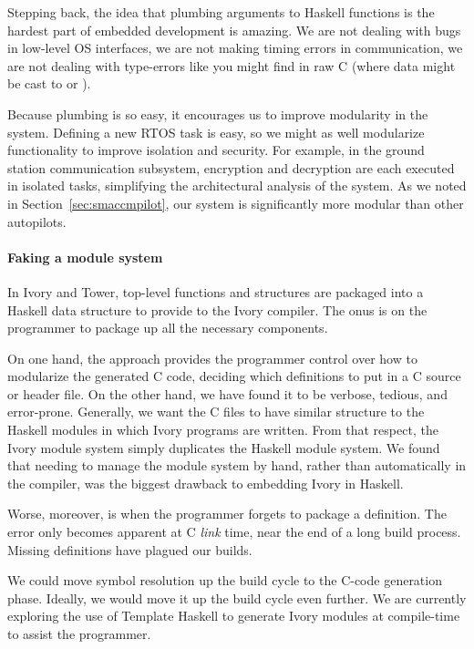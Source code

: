 Stepping back, the idea that plumbing arguments to Haskell functions is the
hardest part of embedded development is amazing.  We are not dealing with bugs
in low-level OS interfaces, we are not making timing errors in communication, we
are not dealing with type-errors like you might find in raw C (where data might
be cast to  or ).

Because plumbing is so easy, it encourages us to improve modularity in the
system.  Defining a new RTOS task is easy, so we might as well modularize
functionality to improve isolation and security.  For example, in the ground
station communication subsystem, encryption and decryption are each executed in
isolated tasks, simplifying the architectural analysis of the system.  As
we noted in Section~\ref{sec:smaccmpilot}, our system is significantly more
modular than other autopilots.

\paragraph{Faking a module system}
In Ivory and Tower, top-level functions and structures are packaged into a
Haskell data structure to provide to the Ivory compiler.  The onus is on the
programmer to package up all the necessary components.

On one hand, the approach provides the programmer control over how to
modularize the generated C code, deciding which definitions to put in a C
source or header file.  On the other hand, we have found it to be verbose,
tedious, and error-prone.  Generally, we want the C files to have similar
structure to the Haskell modules in which Ivory programs are written.  From that
respect, the Ivory module system simply duplicates the Haskell module system.
We found that needing to manage the module system by hand, rather than
automatically in the compiler, was the biggest drawback to embedding Ivory in
Haskell.

Worse, moreover, is when the programmer forgets to package a definition.  The
error only becomes apparent at C \emph{link} time, near the end of a long build
process.  Missing definitions have plagued our builds.

We could move symbol resolution up the build cycle to the C-code generation
phase.  Ideally, we would move it up the build cycle even further.  We are
currently exploring the use of Template Haskell to generate Ivory modules at
compile-time to assist the programmer.

